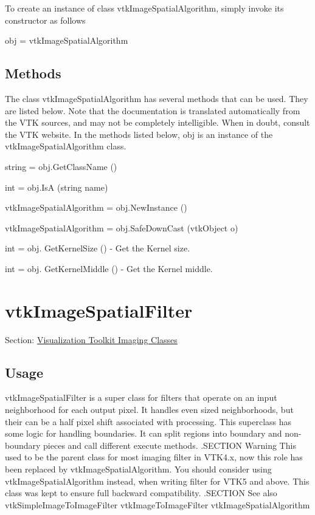 To create an instance of class vtk\-Image\-Spatial\-Algorithm, simply invoke its constructor as follows \begin{DoxyVerb}  obj = vtkImageSpatialAlgorithm
\end{DoxyVerb}
 \hypertarget{vtkwidgets_vtkxyplotwidget_Methods}{}\subsection{Methods}\label{vtkwidgets_vtkxyplotwidget_Methods}
The class vtk\-Image\-Spatial\-Algorithm has several methods that can be used. They are listed below. Note that the documentation is translated automatically from the V\-T\-K sources, and may not be completely intelligible. When in doubt, consult the V\-T\-K website. In the methods listed below, {\ttfamily obj} is an instance of the vtk\-Image\-Spatial\-Algorithm class. 
\begin{DoxyItemize}
\item {\ttfamily string = obj.\-Get\-Class\-Name ()}  
\item {\ttfamily int = obj.\-Is\-A (string name)}  
\item {\ttfamily vtk\-Image\-Spatial\-Algorithm = obj.\-New\-Instance ()}  
\item {\ttfamily vtk\-Image\-Spatial\-Algorithm = obj.\-Safe\-Down\-Cast (vtk\-Object o)}  
\item {\ttfamily int = obj. Get\-Kernel\-Size ()} -\/ Get the Kernel size.  
\item {\ttfamily int = obj. Get\-Kernel\-Middle ()} -\/ Get the Kernel middle.  
\end{DoxyItemize}\hypertarget{vtkimaging_vtkimagespatialfilter}{}\section{vtk\-Image\-Spatial\-Filter}\label{vtkimaging_vtkimagespatialfilter}
Section\-: \hyperlink{sec_vtkimaging}{Visualization Toolkit Imaging Classes} \hypertarget{vtkwidgets_vtkxyplotwidget_Usage}{}\subsection{Usage}\label{vtkwidgets_vtkxyplotwidget_Usage}
vtk\-Image\-Spatial\-Filter is a super class for filters that operate on an input neighborhood for each output pixel. It handles even sized neighborhoods, but their can be a half pixel shift associated with processing. This superclass has some logic for handling boundaries. It can split regions into boundary and non-\/boundary pieces and call different execute methods. .S\-E\-C\-T\-I\-O\-N Warning This used to be the parent class for most imaging filter in V\-T\-K4.\-x, now this role has been replaced by vtk\-Image\-Spatial\-Algorithm. You should consider using vtk\-Image\-Spatial\-Algorithm instead, when writing filter for V\-T\-K5 and above. This class was kept to ensure full backward compatibility. .S\-E\-C\-T\-I\-O\-N See also vtk\-Simple\-Image\-To\-Image\-Filter vtk\-Image\-To\-Image\-Filter vtk\-Image\-Spatial\-Algorithm


